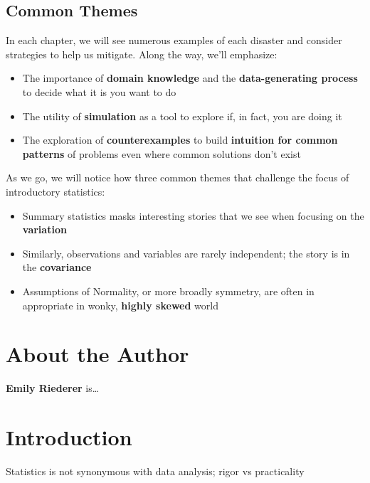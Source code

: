 \documentclass[
]{krantz}
\providecommand{\tightlist}{%
  \setlength{\itemsep}{0pt}\setlength{\parskip}{0pt}}
\begin{document}
\hypertarget{common-themes}{%
\section{Common Themes}\label{common-themes}}

In each chapter, we will see numerous examples of each disaster and consider strategies to help us mitigate.
Along the way, we'll emphasize:

\begin{itemize}
\tightlist
\item
  The importance of \textbf{domain knowledge} and the \textbf{data-generating process} to decide what it is you want to do
\item
  The utility of \textbf{simulation} as a tool to explore if, in fact, you are doing it
\item
  The exploration of \textbf{counterexamples} to build \textbf{intuition for common patterns} of problems even where common solutions don't exist
\end{itemize}

As we go, we will notice how three common themes that challenge the focus of introductory statistics:

\begin{itemize}
\tightlist
\item
  Summary statistics masks interesting stories that we see when focusing on the \textbf{variation}
\item
  Similarly, observations and variables are rarely independent; the story is in the \textbf{covariance}
\item
  Assumptions of Normality, or more broadly symmetry, are often in appropriate in wonky, \textbf{highly skewed} world
\end{itemize}

\hypertarget{about-the-author}{%
\chapter*{About the Author}\label{about-the-author}}


\textbf{Emily Riederer} is\ldots{}

\mainmatter

\hypertarget{introduction}{%
\chapter{Introduction}\label{introduction}}

Statistics is not synonymous with data analysis; rigor vs practicality
\end{document}
